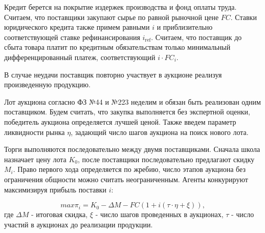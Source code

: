 Кредит берется на покрытие издержек производства и фонд оплаты труда. Считаем, что поставщики закупают сырье по равной рыночной цене $FC$.  Ставки юридического кредита также примем равными $i$ и приблизительно соответствующей ставке рефинансирования $i_{\text{ref}}$. Считаем, что поставщик до сбыта товара платит по кредитным обязательствам только минимальный дифференцированный платеж, соответствующий $i\cdotp FC_i$.

В случае неудачи поставщик повторно участвует в аукционе реализуя произведенную продукцию.

Лот аукциона согласно ФЗ №44 и №223 неделим и обязан быть реализован одним поставщиком. Будем считать, что закупка выполняется без экспертной оценки, победитель аукциона определяется лучшей ценой.  Также введем параметр ликвидности рынка $\eta$, задающий число шагов аукциона на поиск нового лота.

Торги выполняются последовательно между двумя поставщиками. Сначала школа назначает цену лота $K_0$, после поставщики последовательно предлагают скидку  $M_i$.  Право первого хода определяется по жребию, число этапов аукциона без ограничения общности можно считать неограниченным. Агенты конкурируют максимизируя  прибыль поставки $i$:

\begin{equation}
    max\pi_{i}= K_0-\Delta M - FC (1+i(\tau\cdotp\eta + \xi)),
\end{equation}
где $\Delta M$ - итоговая скидка, $\xi$ - число шагов проведенных в аукционах, $\tau$ - число участий в  аукционах  до реализации продукции.